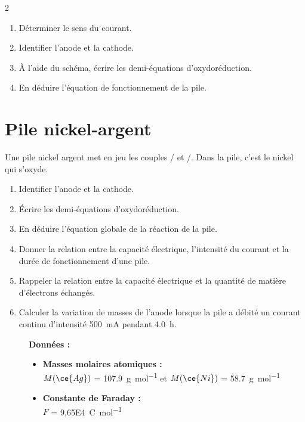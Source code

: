\documentclass[a4paper,11pt,fleqn]{article}%
\begin{document}
\begin{multicols}{2}
\begin{enumerate}
    \item Déterminer le sens du courant.
    \item Identifier l'anode et la cathode.
    \item À l'aide du schéma, écrire les demi-équations d'oxydoréduction.
    \item En déduire l'équation de fonctionnement de la pile.
\end{enumerate}

\section{Pile nickel-argent}
Une pile nickel argent met en jeu les couples / et /. Dans la pile, c'est le nickel  qui s'oxyde.

\begin{enumerate}
    \item Identifier l'anode et la cathode.
    \item Écrire les demi-équations d'oxydoréduction.
    \item En déduire l'équation globale de la réaction de la pile.
    \item Donner la relation entre la capacité électrique, l'intensité du courant et la durée de fonctionnement d'une pile.
    \item Rappeler la relation entre la capacité électrique et la quantité de matière d'électrons échangés.
    \item Calculer la variation de masses de l'anode lorsque la pile a débité un courant continu d'intensité \SI{500}{\milli\ampere} pendant \SI{4,0}{\hour}.
\end{enumerate}

\begin{figure}[H]
    \begin{minipage}{\linewidth}
     \textbf{Données :}
     \begin{itemize}
        \item \textbf{Masses molaires atomiques :}\\
        $M(\ce{Ag})$ = \SI{107,9}{\gram\per\mole} et $M(\ce{Ni})$ = \SI{58,7}{\gram\per\mole}
        \item \textbf{Constante de Faraday :}\\ $F$ = \SI{9,65E4}{\coulomb\per\mole}
    \end{itemize}
    \end{minipage}
\end{figure}


\end{multicols}
\end{document}
